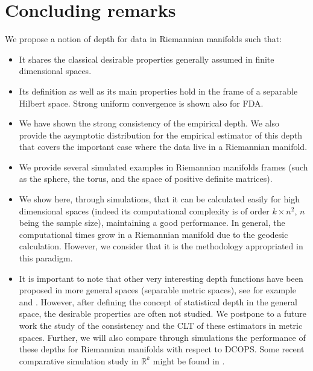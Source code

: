 \documentclass[a4paper]{article}
\numberwithin{equation}{section}
\begin{document}
\section{Concluding remarks}
We propose a notion of depth for data in Riemannian manifolds such that:
\begin{itemize}
\item It shares the classical desirable properties generally assumed in finite dimensional spaces.
\item Its definition as well as its  main properties hold in the frame of a separable Hilbert space. Strong uniform convergence is shown also for FDA.
\item We have shown the strong consistency of the empirical depth. We also  provide the asymptotic distribution for the empirical estimator of this  depth that covers the important case where the data live in a Riemannian manifold.
\item We provide several simulated examples in Riemannian manifolds frames (such as the sphere, the torus, and the space of positive definite matrices). 
\item We show here, through simulations,  that it can be calculated easily  for high dimensional spaces (indeed its computational complexity is of order $k \times n^2$, $n$ being the sample size), maintaining a good performance. In general, the computational times grow in a Riemannian manifold  due to the geodesic calculation. However, we consider that it is the methodology appropriated in this paradigm.

\item It is important to note that other very  interesting  depth functions have been proposed in more general spaces (separable metric spaces), see for example  \cite{liu2011} and \cite{carrizosa1996}. However, after defining the concept of statistical depth in the general space, the desirable properties are  often not studied. We postpone to a future work the study of the consistency and the CLT of these estimators in metric spaces. Further, we will also compare through simulations the performance of these depths for Riemannian manifolds with respect to DCOPS. Some recent comparative simulation study in $\mathbb{R}^k$ might be found in  \cite{shahsavarifar2018}.

\end{itemize}
\end{document}
